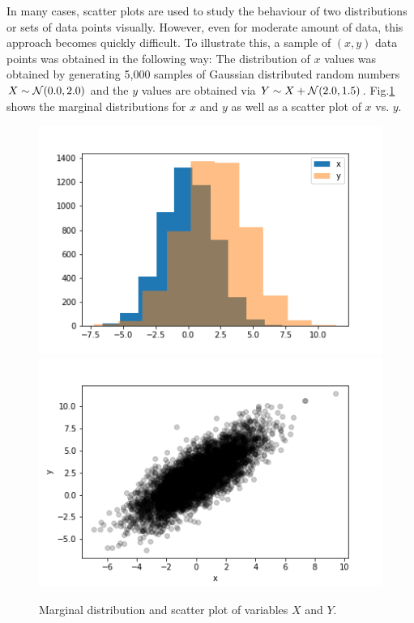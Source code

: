 \documentclass[BCOR=1mm, DIV=calc,10pt,
twoside=true,
twocolumn,
headings=normal]{scrartcl}
\newcommand{\fig}{Fig.}
\begin{document}
In many cases, scatter plots are used to study the behaviour of two distributions or sets of data points visually. However, even for moderate amount of data, this approach becomes quickly difficult. To illustrate this, a sample of $(x,y)$ data points was obtained in the following way: The distribution of $x$ values was obtained by generating 5,000 samples of Gaussian distributed random numbers $X \sim {\cal N}(0.0,2.0)$ and the $y$ values are obtained via $Y \sim X +  {\cal N}(2.0,1.5)$. \fig \ref{fig:scatter} shows the marginal distributions for $x$ and $y$ as well as a scatter plot of $x$ vs. $y$.

\begin{figure}
\begin{center}
\includegraphics[scale=0.5]{../figures/marginal} \includegraphics[scale=0.5]{../figures/scatter}
\caption{\label{fig:scatter} Marginal distribution and scatter plot of variables $X$ and $Y$.}
\end{center}
\end{figure}
\end{document}
